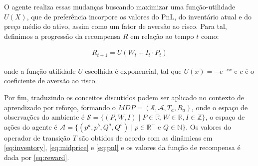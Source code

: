 O agente realiza essas mudanças buscando maximizar uma função-utilidade $U(X)$, que de preferência incorpore os valores do PnL, do inventário atual e do preço médio do ativo, assim como um fator de aversão ao risco. Para tal, definimos a progressão da recompensa $R$ em relação ao tempo $t$ como:

\begin{equation}
	\begin{aligned}
		R_{t + 1} = U(W_{t} + I_{t} \cdot P_{t})
		\label{eq:reward}
	\end{aligned}
\end{equation}

onde a função utilidade $U$ escolhida é exponencial, tal que $U(x) = -e^{-c x}$ e $c$ é o coeficiente de aversão ao risco.

Por fim, traduzindo os conceitos discutidos podem ser aplicado no contexto de aprendizado por reforço, formando o $MDP = (\mathcal{S}, \mathcal{A}, T_{a}, R_{a})$, onde o espaço de observações do ambiente é \(\mathcal{S} = \{(P, W, I) \mid P \in \mathbb{R}, W \in \mathbb{R}, I \in \mathbb{Z}\}\), o espaço de ações do agente é \(\mathcal{A} = \{(p^a, p^b, Q^a, Q^b) \mid p \in \mathbb{R}^+ \text{ e } Q \in \mathbb{N}\}\). Os valores do operador de transição $T$ são obtidos de acordo com as dinâmicas em \ref{eq:inventory}, \ref{eq:midprice} e \ref{eq:pnl} e os valores da função de recompensa é dada por \ref{eq:reward}.